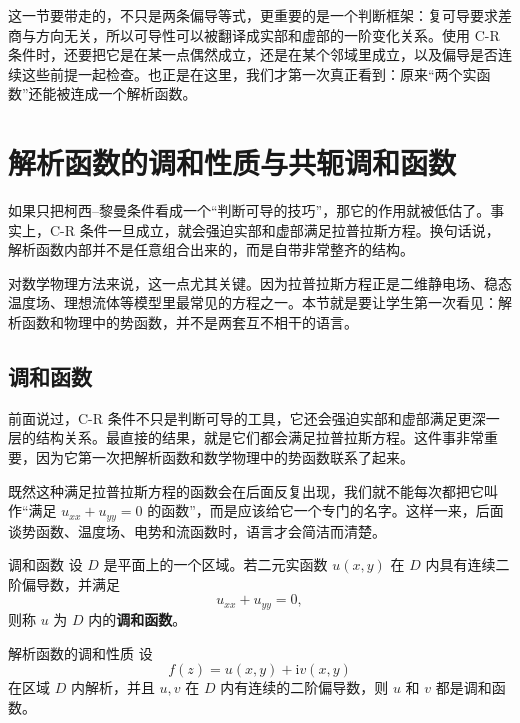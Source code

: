 \begin{tishi}[本节小结]
这一节要带走的，不只是两条偏导等式，更重要的是一个判断框架：复可导要求差商与方向无关，所以可导性可以被翻译成实部和虚部的一阶变化关系。使用 C-R 条件时，还要把它是在某一点偶然成立，还是在某个邻域里成立，以及偏导是否连续这些前提一起检查。也正是在这里，我们才第一次真正看到：原来``两个实函数''还能被连成一个解析函数。
\end{tishi}

\section{解析函数的调和性质与共轭调和函数}

\begin{wulibj}[为什么这一节很重要]
如果只把柯西--黎曼条件看成一个``判断可导的技巧''，那它的作用就被低估了。事实上，C-R 条件一旦成立，就会强迫实部和虚部满足拉普拉斯方程。换句话说，解析函数内部并不是任意组合出来的，而是自带非常整齐的结构。

对数学物理方法来说，这一点尤其关键。因为拉普拉斯方程正是二维静电场、稳态温度场、理想流体等模型里最常见的方程之一。本节就是要让学生第一次看见：解析函数和物理中的势函数，并不是两套互不相干的语言。
\end{wulibj}

\subsection{调和函数}

前面说过，C-R 条件不只是判断可导的工具，它还会强迫实部和虚部满足更深一层的结构关系。最直接的结果，就是它们都会满足拉普拉斯方程。这件事非常重要，因为它第一次把解析函数和数学物理中的势函数联系了起来。

既然这种满足拉普拉斯方程的函数会在后面反复出现，我们就不能每次都把它叫作``满足 $u_{xx}+u_{yy}=0$ 的函数''，而是应该给它一个专门的名字。这样一来，后面谈势函数、温度场、电势和流函数时，语言才会简洁而清楚。

\begin{dingliyi}{调和函数}{}
设 $D$ 是平面上的一个区域。若二元实函数 $u(x,y)$ 在 $D$ 内具有连续二阶偏导数，并满足
\begin{equation}
    u_{xx}+u_{yy}=0,
\end{equation}
则称 $u$ 为 $D$ 内的\textbf{调和函数}。
\end{dingliyi}

\begin{dingli}{解析函数的调和性质}{}
设
\[
    f(z)=u(x,y)+\mathrm{i}v(x,y)
\]
在区域 $D$ 内解析，并且 $u,v$ 在 $D$ 内有连续的二阶偏导数，则 $u$ 和 $v$ 都是调和函数。
\end{dingli}

